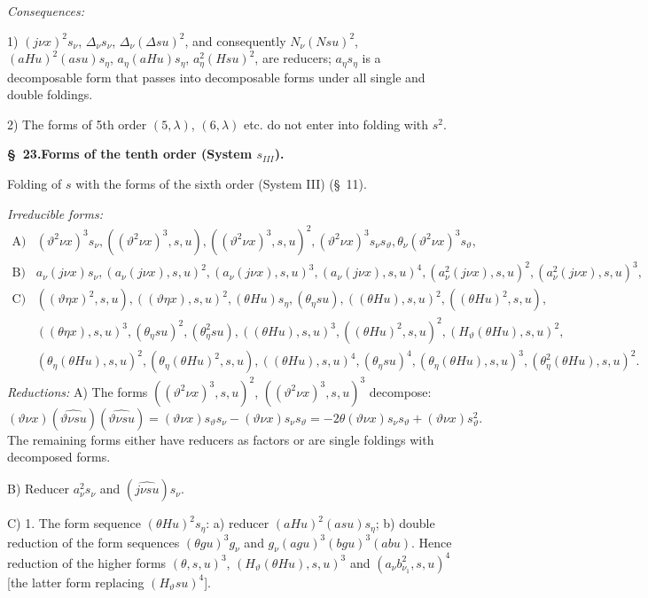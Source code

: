 \documentclass[11pt]{article}
\newcommand{\A}{\Delta}
\begin{document}
\noindent\emph{Consequences:}

1) $(j\nu x)^2s_\nu$, $\A_\nu s_\nu$, $\A_\nu(\A su)^2$, and consequently $N_\nu(Nsu)^2$, $(aHu)^2(asu)s_\eta$, $a_\eta(aHu)s_\eta$, $a_\eta^2(Hsu)^2$, are reducers; $a_\eta s_\eta$ is a decomposable form that passes into decomposable forms under all single and double foldings.

2) The forms of 5th order $(5,\lambda)$, $(6,\lambda)$ etc. do not enter into folding with $s^2$.

\begin{center}\textbf{\S\ 23.\quad Forms of the tenth order (System $s_{III}$).}\end{center}
Folding of $s$ with the forms of the sixth order (System III) (\S\ 11).

\noindent\emph{Irreducible forms:}
\[
\begin{array}{rl}
\text{A)}& (\vartheta^2\nu x)^3s_\nu,
((\vartheta^2\nu x)^3,s,u),
((\vartheta^2\nu x)^3,s,u)^2,
(\vartheta^2\nu x)^3s_\nu s_\vartheta,
\theta_\nu(\vartheta^2\nu x)^3s_\vartheta,\\[0.3em]
\text{B)}& a_\nu(j\nu x)s_\nu,
(a_\nu(j\nu x),s,u)^2,
(a_\nu(j\nu x),s,u)^3,
(a_\nu(j\nu x),s,u)^4,
(a_\nu^2(j\nu x),s,u)^2,
(a_\nu^2(j\nu x),s,u)^3,\\[0.3em]
\text{C)}& ((\vartheta\eta x)^2,s,u),
((\vartheta\eta x),s,u)^2,
(\theta Hu)s_\eta,
(\theta_\eta su),
((\theta Hu),s,u)^2,
((\theta Hu)^2,s,u),\\
& ((\theta\eta x),s,u)^3,
(\theta_\eta su)^2,
(\theta_\eta^2su),
((\theta Hu),s,u)^3,
((\theta Hu)^2,s,u)^2,
(H_\vartheta(\theta Hu),s,u)^2,\\
& (\theta_\eta(\theta Hu),s,u)^2,
(\theta_\eta(\theta Hu)^2,s,u),
((\theta Hu),s,u)^4,
(\theta_\eta su)^4,
(\theta_\eta(\theta Hu),s,u)^3,
(\theta_\eta^2(\theta Hu),s,u)^2.
\end{array}
\]
\noindent\emph{Reductions:}
A) The forms $((\vartheta^2\nu x)^3,s,u)^2$, $((\vartheta^2\nu x)^3,s,u)^3$ decompose:
\[
(\vartheta\nu x)(\widehat{\vartheta\nu su})(\widehat{\vartheta\nu su})=(\vartheta\nu x)s_\vartheta s_\nu-(\vartheta\nu x)s_\nu s_\vartheta=-2\theta(\vartheta\nu x)s_\nu s_\vartheta+(\vartheta\nu x)s_\vartheta^2.
\]
The remaining forms either have reducers as factors or are single foldings with decomposed forms.

B) Reducer $a_\nu^2s_\nu$ and $(\widehat{j\nu su})s_\nu$.

C) 1. The form sequence $(\theta Hu)^2s_\eta$: a) reducer $(aHu)^2(asu)s_\eta$; b) double reduction of the form sequences $(\theta gu)^3g_\nu$ and $g_\nu(agu)^3(bgu)^3(abu)$. Hence reduction of the higher forms $(\theta,s,u)^3$, $(H_\vartheta(\theta Hu),s,u)^3$ and $(a_\nu b_{\nu_1}^2,s,u)^4$ [the latter form replacing $(H_\vartheta su)^4$].
\end{document}
